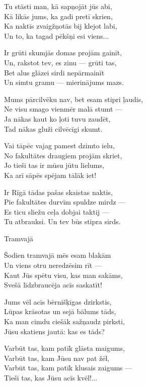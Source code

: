 \documentclass[14pt]{extarticle}
\begin{document}
{{Tu stāsti man, kā sapņojāt jūs abi,\\
Kā likās jums, ka gadi pretī skrien,\\
Ka naktīs zvaigžņotās bij klejot labi,\\
Un to, ka tagad pēkšņi esi viens...

Ir grūti skumjās domas projām gainīt,\\
Un, rakstot tev, es zinu --- grūti tas,\\
Bet alus glāzei sirdi nepārmainīt\\
Un simtu gramu --- mierinājums mazs. 

Mums pārcilvēku nav, bet esam stipri ļaudis,\\
Ne visu smago vienmēr malā stumt ---\\
Ja nākas kaut ko ļoti tuvu zaudēt,\\
Tad nākas gluži cilvēcīgi skumt. 

Vai tāpēc vajag pamest dzimto ielu,\\
No fakultātes draugiem projām skriet,\\
Jo tieši tas ir mūsu jūtu lielums,\\
Ka arī sāpēs spējam tālāk iet!

Ir Rīgā tādas pašas skaistas naktis,\\
Pie fakultātes durvīm spuldze mirdz ---\\
Es ticu sliežu ceļa dobjai taktij ---\\
Tu atbrauksi. Un tev būs stipra sirds.


\newpage

{\large \sc Tramvajā}

Šodien tramvajā mēs esam blakām\\
Un viens otru neredzēsim rīt ---\\
Kaut Jūs spētu visu, kas man sakāms,\\
Svešā līdzbraucēja acīs saskatīt!

Jums vēl acīs bērnišķīgas dzirkstis,\\
Lūpas krāsotas un sejā bālums tāds,\\
Ka man cimdu ciešāk sažņaudz pirksti,\\
Jūsu skatiens jautā: kas es tāds?

Varbūt tas, kam patīk glāsta maigums,\\
Varbūt tas, kam Jūsu nav pat žēl,\\
Varbūt tas, kam patīk klusais zaigums ---\\
Tieši tas, kas Jūsu acīs kvēl!...

}}
\end{document}
